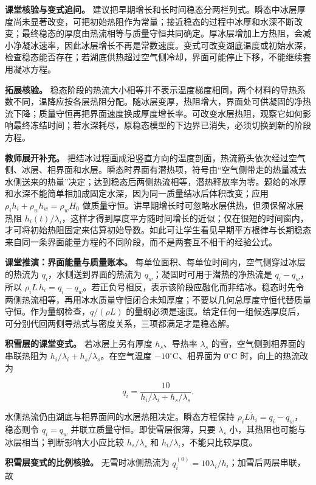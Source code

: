 \documentclass[12pt,a4paper,UTF8]{ctexart}
\begin{document}
\textbf{课堂核验与变式追问。}
建议把早期增长和长时间稳态分两栏列式。瞬态中冰层厚度尚未显著改变，可把初始热阻作为常量；接近稳态的过程中冰厚和水深不断改变；最终稳态的厚度由热流相等与质量守恒共同确定。厚冰层增加上方热阻，会减小净凝冰速率，因此冰层增长不再是常数速度。变式可改变湖底温度或初始水深，检查稳态能否存在；若湖底供热超过空气侧冷却，界面可能停止下移，不能继续套用凝冰方程。

\textbf{拓展核验。}
稳态阶段的热流大小相等并不表示温度梯度相同，两个材料的导热系数不同，温降应按各层热阻分配。随冰层变厚，热阻增大，界面处可供凝固的净热流下降；质量守恒再把界面速度换成厚度增长率。可改变水层热阻，观察它如何影响最终冻结时间；若水深耗尽，原稳态模型的下边界已消失，必须切换到新的阶段方程。

\textbf{教师展开补充。}
把结冰过程画成沿竖直方向的温度剖面，热流箭头依次经过空气侧、冰层、相界面和水层。瞬态时界面有潜热项，符号由``空气侧带走的热量减去水侧送来的热量''决定；达到稳态后两侧热流相等，潜热释放率为零。题给的冰厚和水深不能简单相加成固定水深，因为同一质量结冰后体积改变；应用
\(\rho_i h_i+\rho_w h_w=\rho_wH_0\)
做质量守恒。讲早期增长时可忽略水层供热，但须保留冰层热阻
\(h_i(t)/\lambda_i\)，这样才得到厚度平方随时间增长的近似；仅在很短的时间窗内，才可将初始热阻固定来估算初始导数。如此可让学生看见早期平方根律与长期稳态来自同一条界面能量方程的不同阶段，而不是两套互不相干的经验公式。

\textbf{课堂推演：界面能量与质量账本。}
每单位面积、每单位时间内，空气侧穿过冰层的热流为
\(q_i\)，水侧送到界面的热流为 \(q_w\)；凝固时可用于潜热的净热流是
\(q_i-q_w\)，所以
\(\rho_iL\,\dot h_i=q_i-q_w\)。若正负号相反，表示该阶段应融化而非结冰。稳态时先令两侧热流相等，再用冰水质量守恒闭合未知厚度；不要以几何总厚度守恒代替质量守恒。作为量纲检查，\(q/(\rho L)\)
的量纲必须是速度。给定任何一组候选厚度后，可分别代回两侧导热式与密度关系，三项都满足才是稳态解。

\textbf{积雪层的课堂变式。} 若冰层上另有厚度 \(h_s\)、导热率
\(\lambda_s\) 的雪，空气侧到相界面的串联热阻为
\(h_i/\lambda_i+h_s/\lambda_s\)。在空气温度
\(-10^\circ\mathrm C\)、相界面为 \(0^\circ\mathrm C\) 时，向上的热流改为

\[
q_i=\frac{10}{h_i/\lambda_i+h_s/\lambda_s}.
\]

水侧热流仍由湖底与相界面间的水层热阻决定。瞬态方程保持
\(\rho_iL\dot h_i=q_i-q_w\)，稳态则令 \(q_i=q_w\)
并联立质量守恒。即使雪层很薄，只要 \(\lambda_s\)
小，其热阻也可能与冰层相当；判断影响大小应比较 \(h_s/\lambda_s\) 和
\(h_i/\lambda_i\)，不能只比较厚度。

\textbf{积雪层变式的比例核验。} 无雪时冰侧热流为
\(q_i^{(0)}=10\lambda_i/h_i\)；加雪后两层串联，故
\end{document}
